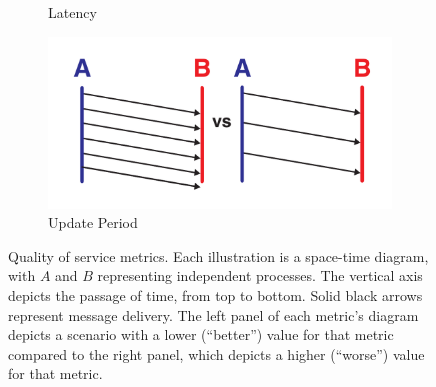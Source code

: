 \begin{figure}
\begin{subfigure}[b]{0.5\textwidth}
    \caption{Latency}
    \label{fig:quality-of-service-metric-definitions-latency}
  \end{subfigure}%
  \begin{subfigure}[b]{0.5\textwidth}
    \centering
    \includegraphics[width=\linewidth]{img/quality-of-service-metric-definitions/simstep-period.pdf}
    \caption{Update Period}
    \label{fig:quality-of-service-metric-definitions-simstep-period}
  \end{subfigure}%
  \caption{
  Quality of service metrics.
  Each illustration is a space-time diagram, with $A$ and $B$ representing independent processes.
  The vertical axis depicts the passage of time, from top to bottom.
  Solid black arrows represent message delivery.
  The left panel of each metric's diagram depicts a scenario with a lower (``better'') value for that metric compared to the right panel, which depicts a higher (``worse'') value for that metric.
  }
  \label{fig:quality-of-service-metric-definitions}
\end{figure}
